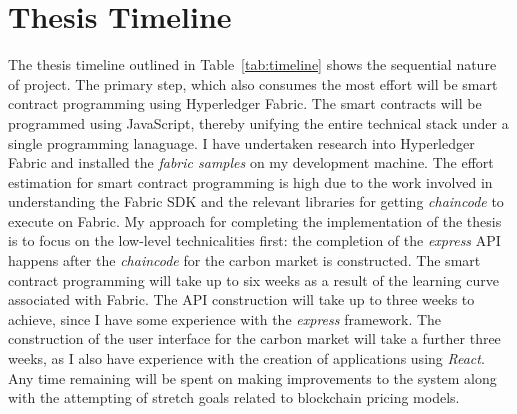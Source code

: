 \section{Thesis Timeline}
The thesis timeline outlined in Table~\ref{tab:timeline}
shows the sequential nature of project. The primary
step, which also consumes the most effort will be smart
contract programming using Hyperledger Fabric. The smart
contracts will be programmed using JavaScript, thereby
unifying the entire technical stack under a single programming
lanaguage. I have undertaken research into Hyperledger
Fabric and installed the \textit{fabric samples} on my
development machine. The effort estimation for smart
contract programming is high due to the work involved in
understanding the Fabric SDK and the relevant libraries
for getting \textit{chaincode} to execute on Fabric.
My approach for completing the implementation of the thesis
is to focus on the low-level technicalities first: the completion
of the \textit{express} API happens
after the \textit{chaincode} for the carbon market is
constructed. The smart contract programming will take
up to six weeks as a result of the learning curve
associated with Fabric. The API construction will take
up to three weeks to achieve, since I have some experience
with the \textit{express} framework. The construction of the
user interface for the carbon market will take a further three
weeks, as I also have experience with the creation of
applications using \textit{React}. Any time remaining will
be spent on making improvements to the system along with the
attempting of stretch goals related to blockchain pricing models.
